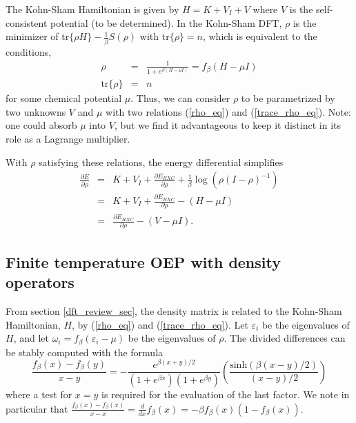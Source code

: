 \documentclass{article}
\newcommand{\beas}{\begin{eqnarray*}}
\newcommand{\enas}{\end{eqnarray*}}
\newcommand{\bea}{\begin{eqnarray}} \newcommand{\ena}{\end{eqnarray}}
\newcommand{\trace}{\mbox{tr}} \newcommand{\real}{\mathcal Re}
\newcommand{\Vscp}{V}
\begin{document}
The Kohn-Sham Hamiltonian is given by $H = K + V_I + \Vscp$ where
$\Vscp$ is the self-consistent potential (to be determined).
In the Kohn-Sham DFT, $\rho$ is the minimizer of
$\trace\{\rho H \} - \frac{1}{\beta} S(\rho)$
with $\trace\{\rho\}=n$, which is equivalent to the conditions,
\bea
\label{rho_eq}
  \rho &=& \frac{1}{1+e^{\beta (H - \mu I)}} = f_\beta(H-\mu I)\\
\label{trace_rho_eq}
  \trace\{\rho\} &=& n
\ena
for some chemical potential $\mu$.
Thus, we can consider $\rho$ to be parametrized by two unknowns
$\Vscp$ and $\mu$ with two relations (\ref{rho_eq}) and (\ref{trace_rho_eq}).
Note: one could absorb $\mu$ into $\Vscp$, but we find it
advantageous to keep it distinct in its role as a Lagrange multiplier.

With $\rho$ satisfying these relations, the energy differential simplifies
\beas
\frac{\partial E}{\partial \rho}
 &=&
 K + V_I + \frac{\partial E_{HXC}}{\partial \rho} +
 \frac{1}{\beta} \log(\rho(I-\rho)^{-1})\\
 &=&
 K + V_I + \frac{\partial E_{HXC}}{\partial \rho} 
 - (H - \mu I)\\
 &=& 
  \frac{\partial E_{HXC}}{\partial \rho} 
 - (\Vscp - \mu I).
\enas
\label{dft_review_sec}

\subsection{Finite temperature OEP with density operators}

From section \ref{dft_review_sec}, the density matrix is
related to the Kohn-Sham Hamiltonian, $H$, by (\ref{rho_eq}) and (\ref{trace_rho_eq}).
Let $\varepsilon_i$ be the eigenvalues of $H$, and let
$\omega_i = f_\beta (\varepsilon_i-\mu)$ be the eigenvalues of $\rho$.
The divided differences can be stably computed with the formula
$$\frac{f_{\beta}(x) - f_{\beta}(y)}{x-y} =
  -\frac{e^{\beta (x+y)/2}}{(1+e^{\beta x})(1+e^{\beta y})}
  \left(\frac{\mbox{sinh}(\beta (x-y)/2)}{(x-y)/2}\right)
$$
where a test for $x=y$ is required for the evaluation of
the last factor.  We note in particular that
$\frac{f_\beta(x)-f_\beta(x)}{x-x} = 
\frac{d}{dx}f_\beta(x) = -\beta f_\beta(x)(1-f_\beta(x))$.
\end{document}
